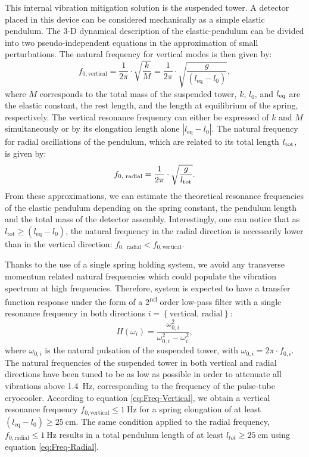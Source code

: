 This internal vibration mitigation solution is the suspended tower. A detector placed in this device can be considered mechanically as a simple elastic pendulum.
The 3-D dynamical description of the elastic-pendulum can be divided into two pseudo-independent equations in the approximation of small perturbations. The natural frequency for vertical modes is then given by:
\begin{equation}
f_{0,\textrm{vertical}}=\frac{1}{2\pi}\cdot\sqrt{\frac{k}{M}} = \frac{1}{2\pi}\cdot\sqrt{\frac{g}{(l_{\textrm{eq}}-l_{0})}}\label{eq:Freq-Vertical},
\end{equation}
where $M$ corresponds to the total mass of the suspended tower, $k$, $l_0$, and $l_{\rm eq}$ are the elastic constant, the rest length, and the length at equilibrium of the spring, respectively. The vertical resonance frequency can either be expressed of $k$ and $M$ simultaneously or by its elongation length alone $|l_{\textrm{eq}}-l_{0}|$. The natural frequency for radial oscillations of the pendulum, which are related to its total length  $l_{\rm tot}$, is given by:
\begin{equation}
f_{0,\textrm{ radial}}=\frac{1}{2\pi}\cdot\sqrt{\frac{g}{l_{\rm tot}}}\label{eq:Freq-Radial}.
\end{equation}
From these approximations, we can estimate the theoretical resonance frequencies of the elastic pendulum depending on the spring constant, the pendulum length and the total mass of the detector assembly. Interestingly, one can notice that as $l_{\textrm{tot}} \geq (l_{\textrm{eq}}-l_{0})$, the natural frequency in the radial direction is necessarily lower than in the vertical direction: $f_{0,\textrm{ radial}}<f_{0,\textrm{vertical}}$. 

Thanks to the use of a single spring holding system, we avoid any transverse momentum related natural frequencies which could populate the vibration spectrum at high frequencies. Therefore, system is expected to have a transfer function response under the form of a 2\textsuperscript{nd} order low-pass filter with a single resonance frequency in both directions $i=\left\{ \textrm{vertical, radial}\right\}$:
\begin{equation}
H(\omega_{i})=\frac{\omega_{0,i}^{2}}{\omega_{0,i}^{2}-\omega_{i}^{2}}\label{eq:Transfer-function},
\end{equation}
where $\omega_{0,i}$ is the natural pulsation of the suspended tower, with $\omega_{0,i}=2\pi\cdot f_{0,i}$. 
The natural frequencies of the suspended tower in both vertical and radial directions have been tuned to be as low as possible in order to attenuate all vibrations above \SI{1.4}{\Hz}, corresponding to the frequency of the pulse-tube cryocooler. According to equation \ref{eq:Freq-Vertical}, we obtain a vertical resonance frequency $f_{0,\textrm{vertical}} \leq \SI{1}{\Hz}$ for a spring elongation of at least $(l_{\textrm{eq}}-l_{0})\geq \SI{25}{\cm}$. The same condition applied to the radial frequency, $f_{0,\textrm{radial}} \leq \SI{1}{\Hz}$ results in a total pendulum length of at least  $l_{tot}\geq \SI{25}{\cm}$ using equation \ref{eq:Freq-Radial}.

